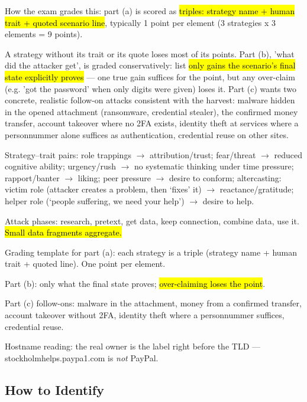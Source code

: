 \documentclass[12pt, a4paper]{article}
\newcommand{\imp}[1]{\hl{#1}}                       %
\begin{document}
How the exam grades this: part (a) is scored as \imp{triples: strategy name + human trait + quoted scenario line}, typically 1 point per element (3 strategies x 3 elements = 9 points).

A strategy without its trait or its quote loses most of its points. Part (b), 'what did the attacker get', is graded conservatively: list \imp{only gains the scenario's final state explicitly proves} --- one true gain suffices for the point, but any over-claim (e.g. 'got the password' when only digits were given) loses it.
Part (c) wants two concrete, realistic follow-on attacks consistent with the harvest: malware hidden in the opened attachment (ransomware, credential stealer), the confirmed money transfer, account takeover where no 2FA exists, identity theft at services where a personnummer alone suffices as authentication, credential reuse on other sites.

\begin{theorybox}
\begin{tightitem}
    \item Strategy--trait pairs: role trappings $\rightarrow$ attribution/trust; fear/threat $\rightarrow$ reduced cognitive ability; urgency/rush $\rightarrow$ no systematic thinking under time pressure; rapport/banter $\rightarrow$ liking;
    peer pressure $\rightarrow$ desire to conform; altercasting: victim role (attacker creates a problem, then `fixes' it) $\rightarrow$ reactance/gratitude; helper role (`people suffering, we need your help') $\rightarrow$ desire to help.
    \item Attack phases: research, pretext, get data, keep connection, combine data, use it. \imp{Small data fragments aggregate.}
    \item Grading template for part (a): each strategy is a triple (strategy name + human trait + quoted line). One point per element.
    \item Part (b): only what the final state proves; \imp{over-claiming loses the point}.
    \item Part (c) follow-ons: malware in the attachment, money from a confirmed transfer, account takeover without 2FA, identity theft where a personnummer suffices, credential reuse.
    \item Hostname reading: the real owner is the label right before the TLD --- stockholmhelps.paypa1.com is \emph{not} PayPal.
\end{tightitem}
\end{theorybox}

\subsection*{How to Identify}
\end{document}
